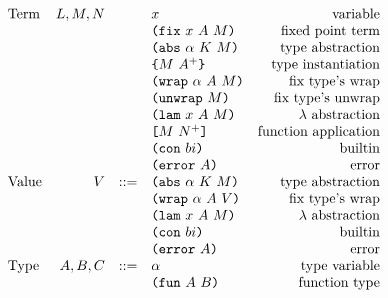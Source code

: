 \documentclass[../main.tex]{subfiles}
\begin{document}
\begin{figure*}[t]
    \centering
    \[\begin{array}{lrclr}
        \textrm{Term}             & L,M,N  &     & x                          & \textrm{variable}\\
                                  &        &     & \texttt{(} \texttt{fix} ~ x ~ A ~ M \texttt{)}              & \textrm{fixed point term}\\
                                  &        &     & \texttt{(} \texttt{abs} ~ \alpha ~ K ~ M \texttt{)}         & \textrm{type abstraction}\\
                                  &        &     & \texttt{\{}M ~ A^+\texttt{\}}              & \textrm{type instantiation}\\
                                  &        &     & \texttt{(} \texttt{wrap} ~ \alpha ~ A ~ M \texttt{)}        & \textrm{fix type's wrap}\\
                                  &        &     & \texttt{(} \texttt{unwrap} ~ M \texttt{)}                 & \textrm{fix type's unwrap}\\
                                  &        &     & \texttt{(} \texttt{lam} ~ x ~ A ~ M \texttt{)}              & \textrm{$\lambda$ abstraction}\\
                                  &        &     & \texttt{[} M ~ N^+ \texttt{]}               & \textrm{function application}\\
                                  &        &     & \texttt{(} \texttt{con} ~ bi \texttt{)}                   & \textrm{builtin}\\
                                  &        &     & \texttt{(} \texttt{error} ~ A \texttt{)}                  & \textrm{error}\\
        \textrm{Value}            & V      & ::= & \texttt{(} \texttt{abs} ~ \alpha ~ K ~ M \texttt{)}         & \textrm{type abstraction}\\
                                  &        &     & \texttt{(} \texttt{wrap} ~ \alpha ~ A ~ V \texttt{)}        & \textrm{fix type's wrap}\\
                                  &        &     & \texttt{(} \texttt{lam} ~ x ~ A ~ M \texttt{)}              & \textrm{$\lambda$ abstraction}\\
                                  &        &     & \texttt{(} \texttt{con} ~ bi \texttt{)}                   & \textrm{builtin}\\
                                  &        &     & \texttt{(} \texttt{error} ~ A \texttt{)}                  & \textrm{error}\\
        \textrm{Type}             & A,B,C  & ::= & \alpha                     & \textrm{type variable}\\
                                  &        &     & \texttt{(} \texttt{fun} ~ A ~ B \texttt{)}                & \textrm{function type}\\

\end{array}\]
\end{figure*}
\end{document}
